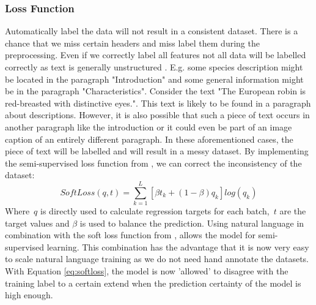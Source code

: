 \documentclass[a4paper, 12pt, oneside]{book} %
\begin{document}

\subsubsection{Loss Function}
Automatically label the data will not result in a consistent dataset.
There is a chance that we miss certain headers and miss label them during the preprocessing.
Even if we correctly label all features not all data will be labelled correctly as text is generally unstructured \autocite{kumar_text_2020}.
E.g. some species description might be located in the paragraph "Introduction" and some general information might be in the paragraph "Characteristics".
Consider the text "The European robin is red-breasted with distinctive eyes.".
This text is likely to be found in a paragraph about descriptions.
However, it is also possible that such a piece of text occurs in another paragraph like the introduction or it could even be part of an image caption of an entirely different paragraph. 
In these aforementioned cases, the piece of text will be labelled and will result in a messy dataset.
By implementing the semi-supervised loss function from \textcite{reed_training_2015}, we can correct the inconsistency of the dataset:
\begin{equation} \label{eq:softloss}
 SoftLoss(q, t) = \sum_{k=1}^{L}[\beta t _k + (1- \beta )q _k]log(q _k)
\end{equation}
Where~$q$ is directly used to calculate regression targets for each batch,~$t$ are the target values and \(\beta\) is used to balance the prediction.
Using natural language in combination with the soft loss function from \textcite{reed_training_2015}, allows the model for semi-supervised learning.
This combination has the advantage that it is now very easy to scale natural language training as we do not need hand annotate the datasets.
With Equation \ref{eq:softloss}, the model is now 'allowed' to disagree with the training label to a certain extend when the prediction certainty of the model is high enough.
\end{document}
